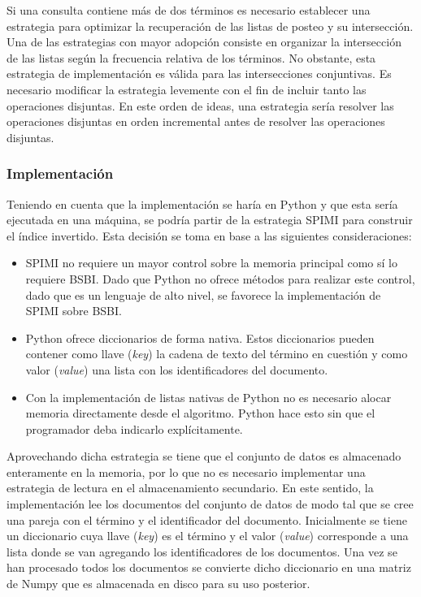 Si una consulta contiene más de dos términos es necesario establecer una estrategia para optimizar la recuperación de las listas de posteo y su intersección. Una de las estrategias con mayor adopción consiste en organizar la intersección de las listas según la frecuencia relativa de los términos. No obstante, esta estrategia de implementación es válida para las intersecciones conjuntivas. Es necesario modificar la estrategia levemente con el fin de incluir tanto las operaciones disjuntas. En este orden de ideas, una estrategia sería resolver las operaciones disjuntas en orden incremental antes de resolver las operaciones disjuntas.


\subsubsection{Implementación}
Teniendo en cuenta que la implementación se haría en Python y que esta sería ejecutada en una máquina, se podría partir de la estrategia SPIMI para construir el índice invertido. Esta decisión se toma en base a las siguientes consideraciones:

\begin{itemize}
    \item SPIMI no requiere un mayor control sobre la memoria principal como sí lo requiere BSBI. Dado que Python no ofrece métodos para realizar este control, dado que es un lenguaje de alto nivel, se favorece la implementación de SPIMI sobre BSBI.
    \item Python ofrece diccionarios de forma nativa. Estos diccionarios pueden contener como llave (\textit{key}) la cadena de texto del término en cuestión y como valor (\textit{value}) una lista con los identificadores del documento.
    \item Con la implementación de listas nativas de Python no es necesario alocar memoria directamente desde el algoritmo. Python hace esto sin que el programador deba indicarlo explícitamente.
\end{itemize}

Aprovechando dicha estrategia se tiene que el conjunto de datos es almacenado enteramente en la memoria, por lo que no es necesario implementar una estrategia de lectura en el almacenamiento secundario. En este sentido, la implementación lee los documentos del conjunto de datos de modo tal que se cree una pareja con el término y el identificador del documento. Inicialmente se tiene un diccionario cuya llave (\textit{key}) es el término y el valor (\textit{value}) corresponde a una lista donde se van agregando los identificadores de los documentos. Una vez se han procesado todos los documentos se convierte dicho diccionario en una matriz de Numpy que es almacenada en disco para su uso posterior.  



